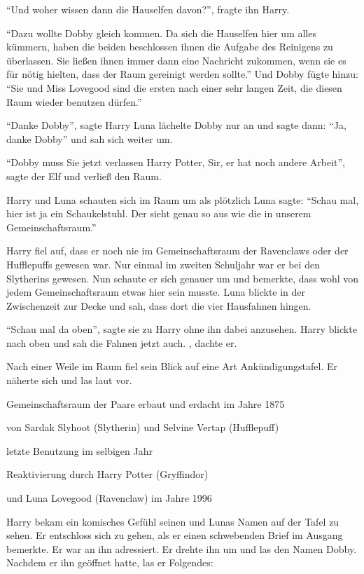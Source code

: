 \enquote{Und woher wissen dann die Hauselfen davon?}, fragte ihn Harry.

\enquote{Dazu wollte Dobby gleich kommen. Da sich die Hauselfen hier um alles kümmern, haben die beiden beschlossen ihnen die Aufgabe des Reinigens zu überlassen. Sie ließen ihnen immer dann eine Nachricht zukommen, wenn sie es für nötig hielten, dass der Raum gereinigt werden sollte.} Und Dobby fügte hinzu: \enquote{Sie und Miss Lovegood sind die ersten nach einer sehr langen Zeit, die diesen Raum wieder benutzen dürfen.}

\enquote{Danke Dobby}, sagte Harry \gst Luna lächelte Dobby nur an und sagte dann: \enquote{Ja, danke Dobby} und sah sich weiter um.

\enquote{Dobby muss Sie jetzt verlassen Harry Potter, Sir, er hat noch andere Arbeit}, sagte der Elf und verließ den Raum.

Harry und Luna schauten sich im Raum um als plötzlich Luna sagte: \enquote{Schau mal, hier ist ja ein Schaukelstuhl. Der sieht genau so aus wie die in unserem Gemeinschaftsraum.}

Harry fiel auf, dass er noch nie im Gemeinschaftsraum der Ravenclaws oder der Hufflepuffs gewesen war. Nur einmal im zweiten Schuljahr war er bei den Slytherins gewesen. Nun schaute er sich genauer um und bemerkte, dass wohl von jedem Gemeinschaftsraum etwas hier sein musste. Luna blickte in der Zwischenzeit zur Decke und sah, dass dort die vier Hausfahnen hingen.

\enquote{Schau mal da oben}, sagte sie zu Harry ohne ihn dabei anzusehen. Harry blickte nach oben und sah die Fahnen jetzt auch. , dachte er.

Nach einer Weile im Raum fiel sein Blick auf eine Art Ankündigungstafel. Er näherte sich und las laut vor.

\begin{brief}
Gemeinschaftsraum der Paare erbaut und erdacht im Jahre 1875

von Sardak Slyhoot (Slytherin) und Selvine Vertap (Hufflepuff)

letzte Benutzung im selbigen Jahr

Reaktivierung durch Harry Potter (Gryffindor)

und Luna Lovegood (Ravenclaw) im Jahre 1996
\end{brief}

Harry bekam ein komisches Gefühl seinen und Lunas Namen auf der Tafel zu sehen. Er entschloss sich zu gehen, als er einen schwebenden Brief im Ausgang bemerkte. Er war an ihn adressiert. Er drehte ihn um und las den Namen Dobby. Nachdem er ihn geöffnet hatte, las er Folgendes:

